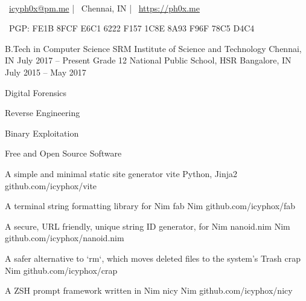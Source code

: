 \documentclass[]{awesome-cv}
\begin{document}
    
\begin{center}
	  \\
	\vspace{2mm}
	{\faEnvelope\ \href{mailto:icyph0x@pm.me}{icyph0x@pm.me}} | {\faMapMarker\ Chennai, IN} | {\faLink\ \url{https://ph0x.me}}
	\begin{center}
		{\faKey\ PGP: FE1B 8FCF E6C1 6222 F157 1C8E 8A93 F96F 78C5 D4C4}
	\end{center} 
\end{center} 


\begin{cventries}
	\cventry
	{B.Tech in Computer Science}
	{SRM Institute of Science and Technology}
	{Chennai, IN}
	{July 2017 – Present}
	{}
	\cventry
	{Grade 12}
	{National Public School, HSR}
	{Bangalore, IN}
	{July 2015 – May 2017}
	{}
\end{cventries}


\vspace{-6mm}
\vspace{3mm}
	{\begin{cvitems}
		\item {Digital Forensics}
		\item {Reverse Engineering}
		\item {Binary Exploitation}
		\item {Free and Open Source Software}
	\end{cvitems}}

\begin{cventries}
	\cventry
	{A simple and minimal static site generator}
	{vite}
	{Python, Jinja2}
	{github.com/icyphox/vite}
	{}
	
	\vspace{-5mm}
	\cventry
	{A terminal string formatting library for Nim}
	{fab}
	{Nim}
	{github.com/icyphox/fab}
	{}

	\vspace{-5mm}
	\cventry
	{A secure, URL friendly, unique string ID generator, for Nim}
	{nanoid.nim}
	{Nim}
	{github.com/icyphox/nanoid.nim}
	{}

	\vspace{-5mm}
	\cventry
	{A safer alternative to `rm`, which moves deleted files to the system's Trash}  
	{crap}
	{Nim}
	{github.com/icyphox/crap}
	{}
	
	\vspace{-5mm}
	\cventry
	{A ZSH prompt framework written in Nim}
	{nicy}
	{Nim}
	{github.com/icyphox/nicy}
	{}

	\vspace {-5mm}

\end{cventries}
\end{document}
